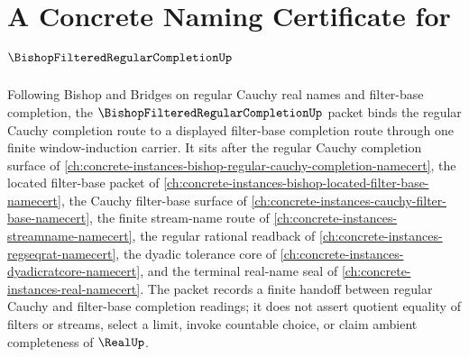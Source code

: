 \chapter{A Concrete Naming Certificate for $\BishopFilteredRegularCompletionUp$}
\label{ch:concrete-instances-bishop-filtered-regular-completion-namecert}

Following Bishop and Bridges on regular Cauchy real names and filter-base completion, the $\BishopFilteredRegularCompletionUp$ packet binds the regular Cauchy completion route to a displayed filter-base completion route through one finite window-induction carrier. It sits after the regular Cauchy completion surface of \autoref{ch:concrete-instances-bishop-regular-cauchy-completion-namecert}, the located filter-base packet of \autoref{ch:concrete-instances-bishop-located-filter-base-namecert}, the Cauchy filter-base surface of \autoref{ch:concrete-instances-cauchy-filter-base-namecert}, the finite stream-name route of \autoref{ch:concrete-instances-streamname-namecert}, the regular rational readback of \autoref{ch:concrete-instances-regseqrat-namecert}, the dyadic tolerance core of \autoref{ch:concrete-instances-dyadicratcore-namecert}, and the terminal real-name seal of \autoref{ch:concrete-instances-real-namecert}. The packet records a finite handoff between regular Cauchy and filter-base completion readings; it does not assert quotient equality of filters or streams, select a limit, invoke countable choice, or claim ambient completeness of $\RealUp$.

